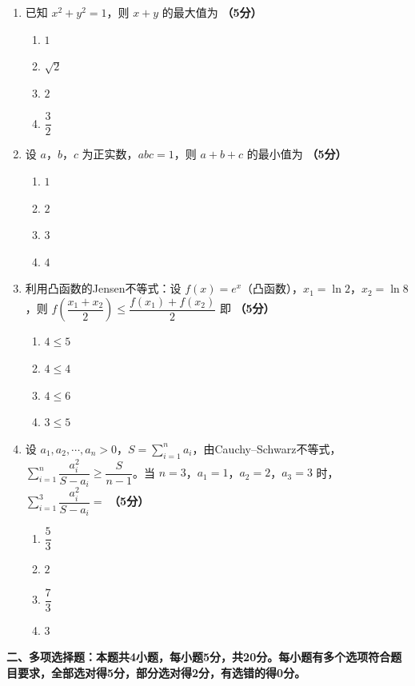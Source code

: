 \documentclass[12pt, a4paper]{ctexart}
\newcommand{\score}[1]{\hfill\textbf{（#1分）}}
\begin{document}
\begin{enumerate}
\item 已知 $x^2+y^2=1$，则 $x+y$ 的最大值为 \score{5}
\begin{enumerate}[label=\Alph*.]
    \item $1$
    \item $\sqrt{2}$
    \item $2$
    \item $\dfrac{3}{2}$
\end{enumerate}

\item 设 $a$，$b$，$c$ 为正实数，$abc=1$，则 $a+b+c$ 的最小值为 \score{5}
\begin{enumerate}[label=\Alph*.]
    \item $1$
    \item $2$
    \item $3$
    \item $4$
\end{enumerate}

\item 利用凸函数的Jensen不等式：设 $f(x)=e^x$（凸函数），$x_1=\ln 2$，$x_2=\ln 8$，则 $f\left(\dfrac{x_1+x_2}{2}\right)\leq \dfrac{f(x_1)+f(x_2)}{2}$ 即 \score{5}
\begin{enumerate}[label=\Alph*.]
    \item $4\leq 5$
    \item $4\leq 4$
    \item $4\leq 6$
    \item $3\leq 5$
\end{enumerate}

\item 设 $a_1,a_2,\cdots,a_n>0$，$S=\displaystyle\sum_{i=1}^{n}a_i$，由Cauchy--Schwarz不等式，$\displaystyle\sum_{i=1}^{n}\dfrac{a_i^2}{S-a_i}\geq \dfrac{S}{n-1}$。当 $n=3$，$a_1=1$，$a_2=2$，$a_3=3$ 时，$\displaystyle\sum_{i=1}^{3}\dfrac{a_i^2}{S-a_i}=$ \score{5}
\begin{enumerate}[label=\Alph*.]
    \item $\dfrac{5}{3}$
    \item $2$
    \item $\dfrac{7}{3}$
    \item $3$
\end{enumerate}

\end{enumerate}

\vspace{10pt}

{\large\bfseries 二、多项选择题：本题共4小题，每小题5分，共20分。每小题有多个选项符合题目要求，全部选对得5分，部分选对得2分，有选错的得0分。}
\end{document}
